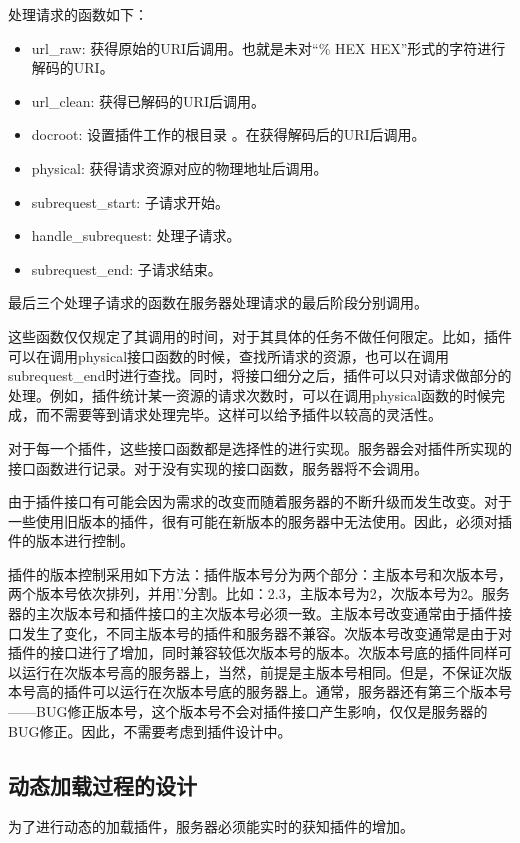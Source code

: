 \documentclass[twoside, xetex]{report}
\begin{document}
	处理请求的函数如下：
	\begin{itemize}
		\item url\_raw: 获得原始的URI后调用。也就是未对“\% HEX HEX”形式的字符进行解码的URI。
		\item url\_clean: 获得已解码的URI后调用。
		\item docroot: 设置插件工作的根目录 。在获得解码后的URI后调用。
		\item physical: 获得请求资源对应的物理地址后调用。
		\item subrequest\_start: 子请求开始。
		\item handle\_subrequest: 处理子请求。
		\item subrequest\_end: 子请求结束。
	\end{itemize}
	
	最后三个处理子请求的函数在服务器处理请求的最后阶段分别调用。
	
	这些函数仅仅规定了其调用的时间，对于其具体的任务不做任何限定。比如，插件可以在调用physical接口函数的时候，查找所请求的资源，也可以在调用subrequest\_end时进行查找。同时，将接口细分之后，插件可以只对请求做部分的处理。例如，插件统计某一资源的请求次数时，可以在调用physical函数的时候完成，而不需要等到请求处理完毕。这样可以给予插件以较高的灵活性。
	
	对于每一个插件，这些接口函数都是选择性的进行实现。服务器会对插件所实现的接口函数进行记录。对于没有实现的接口函数，服务器将不会调用。
	
	由于插件接口有可能会因为需求的改变而随着服务器的不断升级而发生改变。对于一些使用旧版本的插件，很有可能在新版本的服务器中无法使用。因此，必须对插件的版本进行控制。
	
	插件的版本控制采用如下方法：插件版本号分为两个部分：主版本号和次版本号，两个版本号依次排列，并用'.'分割。比如：2.3，主版本号为2，次版本号为2。服务器的主次版本号和插件接口的主次版本号必须一致。主版本号改变通常由于插件接口发生了变化，不同主版本号的插件和服务器不兼容。次版本号改变通常是由于对插件的接口进行了增加，同时兼容较低次版本号的版本。次版本号底的插件同样可以运行在次版本号高的服务器上，当然，前提是主版本号相同。但是，不保证次版本号高的插件可以运行在次版本号底的服务器上。通常，服务器还有第三个版本号——BUG修正版本号，这个版本号不会对插件接口产生影响，仅仅是服务器的BUG修正。因此，不需要考虑到插件设计中。
	
\subsection{动态加载过程的设计}
	为了进行动态的加载插件，服务器必须能实时的获知插件的增加。
	
\end{document}

